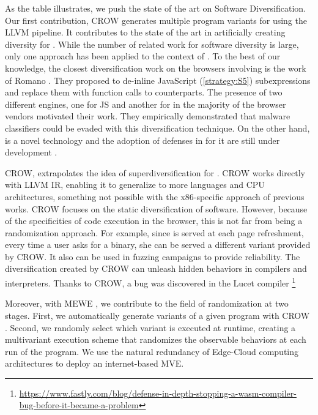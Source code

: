 As the table illustrates, we push the state of the art on Software Diversification. Our first contribution, CROW \cite{CROW} generates multiple program variants for \wasm using the LLVM pipeline.
It contributes to the state of the art in artificially creating diversity for \wasm. While the number of related work for software diversity is large, only one approach has been applied to the context of \wasm. To the best of our knowledge, the closest diversification work on the browsers involving \wasm is the work of Romano \etal \cite{wobfuscator}. They proposed to de-inline JavaScript (\autoref{strategy:S5}) subexpressions and replace them with function calls to \wasm counterparts. The presence of two different engines, one for JS and another for \wasm in the majority of the browser vendors motivated their work. They empirically demonstrated that malware classifiers could be evaded with this diversification technique. On the other hand, \wasm is a novel technology and the adoption of defenses in for it are still under development \cite{Narayan2021Swivel, johnson2021}.

CROW, extrapolates the idea of superdiversification \cite{jacob2008superdiversifier} for \wasm. CROW works directly with LLVM IR, enabling it to generalize to more languages and CPU architectures, something not possible with the x86-specific approach of previous works.
CROW focuses on the static diversification of software. However, because of the specificities of code execution in the browser, this is not far from being a randomization approach. For example, since \wasm is served at each page refreshment, every time a user asks for a \wasm binary, she can be served a different variant provided by CROW.
It also can be used in fuzzing campaigns \citationneeded to provide reliability. The diversification created by CROW can unleash hidden behaviors in compilers and interpreters. Thanks to CROW, a bug was discovered in the Lucet compiler \footnote{\url{https://www.fastly.com/blog/defense-in-depth-stopping-a-wasm-compiler-bug-before-it-became-a-problem}} 


Moreover, with MEWE \cite{MEWE}, we contribute to the field of randomization at two stages. First, we automatically generate variants of a given program with CROW \cite{CROW}. Second, we randomly select which variant is executed at runtime, creating a multivariant execution scheme that randomizes the observable behaviors at each run of the program. We use the natural redundancy of Edge-Cloud computing architectures to deploy an internet-based MVE.



